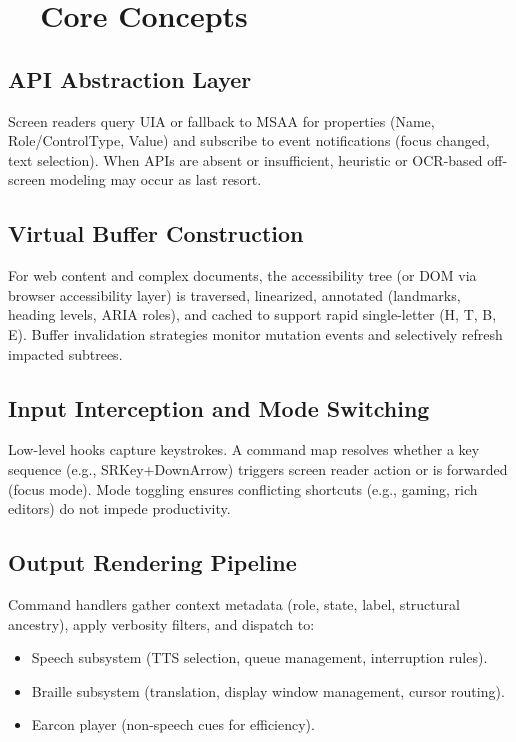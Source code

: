 \section{~~Core Concepts}
\label{sec:sr-core-concepts}
\subsection*{API Abstraction Layer}
Screen readers query UIA or fallback to MSAA for properties (Name, Role/ControlType, Value) and subscribe to event notifications (focus changed, text selection). When APIs are absent or insufficient, heuristic or OCR-based off-screen modeling may occur as last resort.

\subsection*{Virtual Buffer Construction}
For web content and complex documents, the accessibility tree (or DOM via browser accessibility layer) is traversed, linearized, annotated (landmarks, heading levels, ARIA roles), and cached to support rapid single-letter  (H, T, B, E). Buffer invalidation strategies monitor mutation events and selectively refresh impacted subtrees.

\subsection*{Input Interception and Mode Switching}
Low-level hooks capture keystrokes. A command map resolves whether a key sequence (e.g., SRKey+DownArrow) triggers screen reader action or is forwarded (focus mode). Mode toggling ensures conflicting shortcuts (e.g., gaming, rich editors) do not impede productivity.

\subsection*{Output Rendering Pipeline}
Command handlers gather context metadata (role, state, label, structural ancestry), apply verbosity filters, and dispatch to:
\begin{itemize}
	\item Speech subsystem (TTS selection, queue management, interruption rules).
	\item Braille subsystem (translation, display window management, cursor routing).
	\item Earcon player (non-speech cues for efficiency).
\end{itemize}

